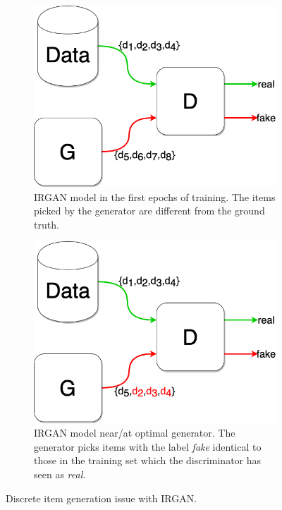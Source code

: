 \begin{figure}[htbp]
    \centering
    \begin{subfigure}[b]{0.48\textwidth}
        \centering
        \includegraphics[width=\textwidth]{model/irgan_problem1.png}
        \caption{IRGAN model in the first epochs of training. The items picked by the generator are different from the ground truth.}
        \label{fig:irgan_problem1}
    \end{subfigure}
    \hfill
    \begin{subfigure}[b]{0.48\textwidth}
        \centering
        \includegraphics[width=\textwidth]{model/irgan_problem2.png}
        \caption{IRGAN model near/at optimal generator. The generator picks items with the label \emph{fake} identical to those in the training set which the discriminator has seen as \emph{real}.}
        \label{fig:irgan_problem2}
    \end{subfigure}
    \caption{Discrete item generation issue with IRGAN.}
    \label{fig:irgan_problem}
\end{figure}

